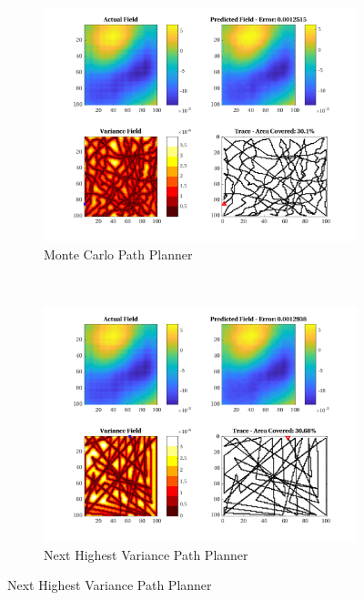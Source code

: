 \begin{figure}[htb!]
    \centering
    \begin{subfigure}[t]{0.5\textwidth}
        \centering
        \includegraphics[width=\linewidth]{figures/hbresults/mc_30p_100x100_sf_25_seed_3.png}
        \captionsetup{skip=0.10\baselineskip,size=footnotesize}
        \caption{Monte Carlo Path Planner}
    \end{subfigure}%
    ~ 
    \begin{subfigure}[t]{0.5\textwidth}
        \centering
        \includegraphics[width=\linewidth]{figures/hbresults/nhv_30p_100x100_sf_25_seed_3.png}
        \captionsetup{skip=0.10\baselineskip,size=footnotesize}
        \caption{Next Highest Variance Path Planner}

\end{subfigure}
\end{figure}
